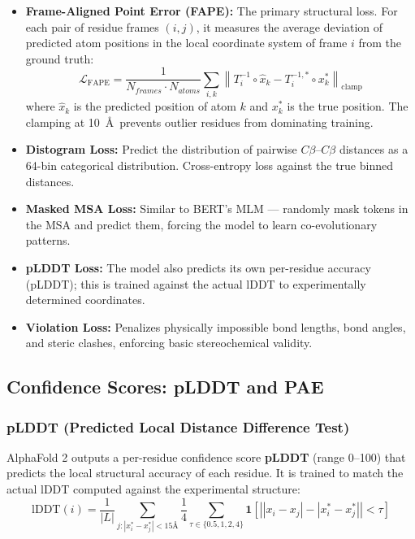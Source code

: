 ﻿\documentclass[12pt,a4paper]{article}
\begin{document}
\begin{itemize}[leftmargin=*, itemsep=5pt]
  \item \textbf{Frame-Aligned Point Error (FAPE):} The primary structural loss. For each pair of residue frames $(i,j)$, it measures the average deviation of predicted atom positions in the local coordinate system of frame $i$ from the ground truth:
  $$\mathcal{L}_\text{FAPE} = \frac{1}{N_{frames} \cdot N_{atoms}} \sum_{i,k} \left\| T_i^{-1} \circ \hat{x}_k - T_i^{-1,*} \circ x_k^* \right\|_{\text{clamp}}$$
  where $\hat{x}_k$ is the predicted position of atom $k$ and $x_k^*$ is the true position. The clamping at 10~\AA\ prevents outlier residues from dominating training.
  
  \item \textbf{Distogram Loss:} Predict the distribution of pairwise $C\beta$--$C\beta$ distances as a 64-bin categorical distribution. Cross-entropy loss against the true binned distances.
  
  \item \textbf{Masked MSA Loss:} Similar to BERT's MLM --- randomly mask tokens in the MSA and predict them, forcing the model to learn co-evolutionary patterns.
  
  \item \textbf{pLDDT Loss:} The model also predicts its own per-residue accuracy (pLDDT); this is trained against the actual lDDT to experimentally determined coordinates.
  
  \item \textbf{Violation Loss:} Penalizes physically impossible bond lengths, bond angles, and steric clashes, enforcing basic stereochemical validity.
\end{itemize}

\subsection{Confidence Scores: pLDDT and PAE}

\subsubsection{pLDDT (Predicted Local Distance Difference Test)}

AlphaFold 2 outputs a per-residue confidence score \textbf{pLDDT} (range 0--100) that predicts the local structural accuracy of each residue. It is trained to match the actual lDDT computed against the experimental structure:
$$\text{lDDT}(i) = \frac{1}{|L|} \sum_{j: |x_i^* - x_j^*| < 15\text{\AA}} \frac{1}{4}\sum_{\tau \in \{0.5, 1, 2, 4\}} \mathbf{1}\!\left[\left||x_i - x_j| - |x_i^* - x_j^*|\right| < \tau\right]$$
\end{document}
